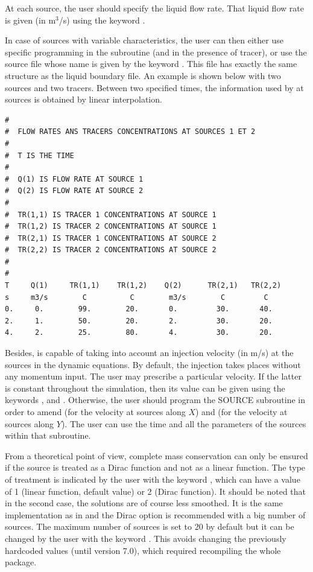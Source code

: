 At each source, the user should specify the liquid flow rate. That liquid flow
rate is given (in m${}^{3}$/s) using the keyword .

In case of sources with variable characteristics, the user can then either use
specific programming in the  subroutine (and
 in the presence of tracer), or use the source file whose
name is given by the keyword .
This file has exactly the same structure as the liquid
boundary file. An example is shown below with two sources and two tracers.
Between two specified times, the information used by  at sources is
obtained by linear interpolation.

\begin{lstlisting}[language=TelemacCas]
#
#  FLOW RATES ANS TRACERS CONCENTRATIONS AT SOURCES 1 ET 2
#
#  T IS THE TIME
#
#  Q(1) IS FLOW RATE AT SOURCE 1
#  Q(2) IS FLOW RATE AT SOURCE 2
#
#  TR(1,1) IS TRACER 1 CONCENTRATIONS AT SOURCE 1
#  TR(1,2) IS TRACER 2 CONCENTRATIONS AT SOURCE 1
#  TR(2,1) IS TRACER 1 CONCENTRATIONS AT SOURCE 2
#  TR(2,2) IS TRACER 2 CONCENTRATIONS AT SOURCE 2
#
#
T     Q(1)     TR(1,1)    TR(1,2)    Q(2)      TR(2,1)   TR(2,2)
s     m3/s        C          C        m3/s        C         C
0.     0.        99.        20.       0.         30.       40.
2.     1.        50.        20.       2.         30.       20.
4.     2.        25.        80.       4.         30.       20.
\end{lstlisting}

Besides,  is capable of taking into account an injection velocity (in
m/s) at the sources in the dynamic equations. By default, the injection takes
places without any momentum input. The user may prescribe a particular
velocity. If the latter is constant throughout the simulation, then its value
can be given using the keywords ,
 and
. Otherwise, the user
should program the SOURCE subroutine in order to amend  (for the
velocity at sources along $X$) and  (for the velocity at sources
along $Y$). The user can use the time and all the parameters of the sources
within that subroutine.

From a theoretical point of view, complete mass conservation can only be ensured
if the source is treated as a Dirac function and not as a linear function.
The type of treatment is indicated by the user with the keyword
, which can have a value of 1 (linear function,
default value) or 2 (Dirac function).
It should be noted that in the second case, the solutions are of course
less smoothed.
It is the same implementation as in  and the Dirac option is
recommended with a big number of sources.
The maximum number of sources is set to 20 by default but it can be changed
by the user with the keyword .
This avoids changing the previously hardcoded values (until version 7.0),
which required recompiling the whole package.

